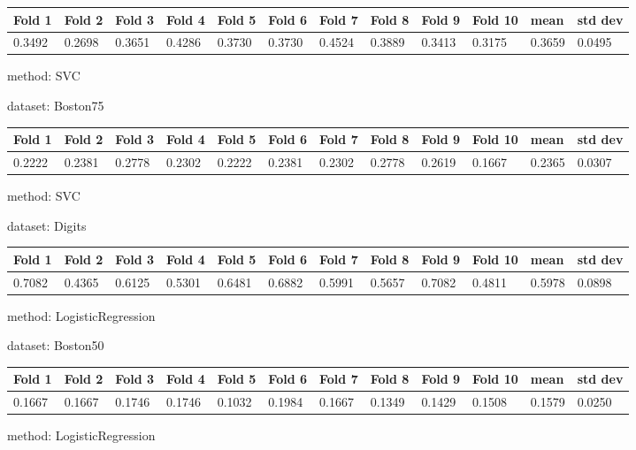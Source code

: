\documentclass{article}
\begin{document}
\begin{center}
	\begin{tabular}  { | l | l | l | l | l | l | l | l | l | l | l | l | }
	\hline
	Fold 1 & Fold 2 & Fold 3 & Fold 4 & Fold 5 & Fold 6 & Fold 7 & Fold 8 & Fold 9 & Fold 10 & mean & std dev\\ \hline
	0.3492 & 0.2698 & 0.3651 & 0.4286 & 0.3730 & 0.3730 & 0.4524 & 0.3889 & 0.3413 & 0.3175 & 0.3659 & 0.0495\\
	\hline
	\end{tabular}
\end{center}
\noindent method: SVC

\noindent dataset: Boston75

\begin{center}
	\begin{tabular}  { | l | l | l | l | l | l | l | l | l | l | l | l | }
	\hline
	Fold 1 & Fold 2 & Fold 3 & Fold 4 & Fold 5 & Fold 6 & Fold 7 & Fold 8 & Fold 9 & Fold 10 & mean & std dev\\ \hline
	0.2222 & 0.2381 & 0.2778 & 0.2302 & 0.2222 & 0.2381 & 0.2302 & 0.2778 & 0.2619 & 0.1667 & 0.2365 & 0.0307\\
	\hline
	\end{tabular}
\end{center}
\noindent method: SVC

\noindent dataset: Digits

\begin{center}
	\begin{tabular}  { | l | l | l | l | l | l | l | l | l | l | l | l | }
	\hline
	Fold 1 & Fold 2 & Fold 3 & Fold 4 & Fold 5 & Fold 6 & Fold 7 & Fold 8 & Fold 9 & Fold 10 & mean & std dev\\ \hline
	0.7082 & 0.4365 & 0.6125 & 0.5301 & 0.6481 & 0.6882 & 0.5991 & 0.5657 & 0.7082 & 0.4811 & 0.5978 & 0.0898\\
	\hline
	\end{tabular}
\end{center}
\noindent method: LogisticRegression

\noindent dataset: Boston50

\begin{center}
	\begin{tabular}  { | l | l | l | l | l | l | l | l | l | l | l | l | }
	\hline
	Fold 1 & Fold 2 & Fold 3 & Fold 4 & Fold 5 & Fold 6 & Fold 7 & Fold 8 & Fold 9 & Fold 10 & mean & std dev\\ \hline
	0.1667 & 0.1667 & 0.1746 & 0.1746 & 0.1032 & 0.1984 & 0.1667 & 0.1349 & 0.1429 & 0.1508 & 0.1579 & 0.0250\\
	\hline
	\end{tabular}
\end{center}
\noindent method: LogisticRegression
\end{document}
